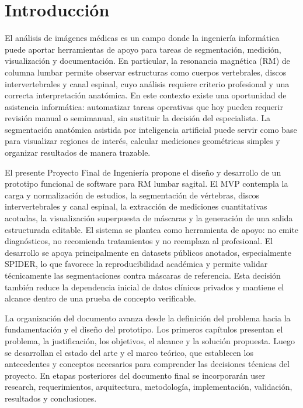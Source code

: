 \chapter{Introducci\'on}

El an\'alisis de im\'agenes m\'edicas es un campo donde la ingenier\'ia inform\'atica puede aportar herramientas de apoyo para tareas de segmentaci\'on, medici\'on, visualizaci\'on y documentaci\'on. En particular, la resonancia magn\'etica (RM) de columna lumbar permite observar estructuras como cuerpos vertebrales, discos intervertebrales y canal espinal, cuyo an\'alisis requiere criterio profesional y una correcta interpretaci\'on anat\'omica. En este contexto existe una oportunidad de asistencia inform\'atica: automatizar tareas operativas que hoy pueden requerir revisi\'on manual o semimanual, sin sustituir la decisi\'on del especialista. La segmentaci\'on anat\'omica asistida por inteligencia artificial puede servir como base para visualizar regiones de inter\'es, calcular mediciones geom\'etricas simples y organizar resultados de manera trazable.

El presente Proyecto Final de Ingenier\'ia propone el dise\~no y desarrollo de un prototipo funcional de software para RM lumbar sagital. El MVP contempla la carga y normalizaci\'on de estudios, la segmentaci\'on de v\'ertebras, discos intervertebrales y canal espinal, la extracci\'on de mediciones cuantitativas acotadas, la visualizaci\'on superpuesta de m\'ascaras y la generaci\'on de una salida estructurada editable. El sistema se plantea como herramienta de apoyo: no emite diagn\'osticos, no recomienda tratamientos y no reemplaza al profesional. El desarrollo se apoya principalmente en datasets p\'ublicos anotados, especialmente SPIDER, lo que favorece la reproducibilidad acad\'emica y permite validar t\'ecnicamente las segmentaciones contra m\'ascaras de referencia. Esta decisi\'on tambi\'en reduce la dependencia inicial de datos cl\'inicos privados y mantiene el alcance dentro de una prueba de concepto verificable.

La organizaci\'on del documento avanza desde la definici\'on del problema hacia la fundamentaci\'on y el dise\~no del prototipo. Los primeros cap\'itulos presentan el problema, la justificaci\'on, los objetivos, el alcance y la soluci\'on propuesta. Luego se desarrollan el estado del arte y el marco te\'orico, que establecen los antecedentes y conceptos necesarios para comprender las decisiones t\'ecnicas del proyecto. En etapas posteriores del documento final se incorporar\'an user research, requerimientos, arquitectura, metodolog\'ia, implementaci\'on, validaci\'on, resultados y conclusiones.
